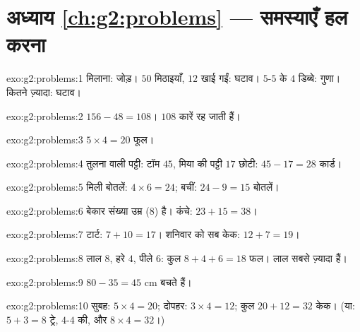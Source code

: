 \section*{अध्याय \ref{ch:g2:problems} --- समस्याएँ हल करना}

\begin{solution}{exo:g2:problems:1}
मिलाना: जोड़। $50$ मिठाइयाँ, $12$ खाई गईं: घटाव। $5$-$5$ के $4$
डिब्बे: गुणा। कितने ज़्यादा: घटाव।
\end{solution}

\begin{solution}{exo:g2:problems:2}
$156 - 48 = 108$। $108$ कारें रह जाती हैं।
\end{solution}

\begin{solution}{exo:g2:problems:3}
$5 \times 4 = 20$ फूल।
\end{solution}

\begin{solution}{exo:g2:problems:4}
तुलना वाली पट्टी: टॉम $45$, मिया की पट्टी $17$ छोटी:
$45 - 17 = 28$ कार्ड।
\end{solution}

\begin{solution}{exo:g2:problems:5}
मिली बोतलें: $4 \times 6 = 24$; बचीं:
$24 - 9 = 15$ बोतलें।
\end{solution}

\begin{solution}{exo:g2:problems:6}
बेकार संख्या उम्र ($8$) है। कंचे:
$23 + 15 = 38$।
\end{solution}

\begin{solution}{exo:g2:problems:7}
टार्ट: $7 + 10 = 17$। शनिवार को सब केक:
$12 + 7 = 19$।
\end{solution}

\begin{solution}{exo:g2:problems:8}
लाल $8$, हरे $4$, पीले $6$: कुल $8 + 4 + 6 = 18$ फल।
लाल सबसे ज़्यादा हैं।
\end{solution}

\begin{solution}{exo:g2:problems:9}
$80 - 35 = 45$ cm बचते हैं।
\end{solution}

\begin{solution}{exo:g2:problems:10}
सुबह: $5 \times 4 = 20$; दोपहर: $3 \times 4 = 12$; कुल
$20 + 12 = 32$ केक। (या: $5 + 3 = 8$ ट्रे, $4$-$4$ की, और
$8 \times 4 = 32$।)

\end{solution}

